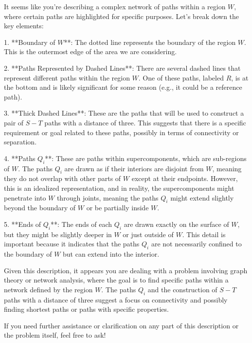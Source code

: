 It seems like you're describing a complex network of paths within a region \( W \), where certain paths are highlighted for specific purposes. Let's break down the key elements:

1. **Boundary of \( W \)**: The dotted line represents the boundary of the region \( W \). This is the outermost edge of the area we are considering.

2. **Paths Represented by Dashed Lines**: There are several dashed lines that represent different paths within the region \( W \). One of these paths, labeled \( R \), is at the bottom and is likely significant for some reason (e.g., it could be a reference path).

3. **Thick Dashed Lines**: These are the paths that will be used to construct a pair of \( S-T \) paths with a distance of three. This suggests that there is a specific requirement or goal related to these paths, possibly in terms of connectivity or separation.

4. **Paths \( Q_i \)**: These are paths within supercomponents, which are sub-regions of \( W \). The paths \( Q_i \) are drawn as if their interiors are disjoint from \( W \), meaning they do not overlap with other parts of \( W \) except at their endpoints. However, this is an idealized representation, and in reality, the supercomponents might penetrate into \( W \) through joints, meaning the paths \( Q_i \) might extend slightly beyond the boundary of \( W \) or be partially inside \( W \).

5. **Ends of \( Q_i \)**: The ends of each \( Q_i \) are drawn exactly on the surface of \( W \), but they might be slightly deeper in \( W \) or just outside of \( W \). This detail is important because it indicates that the paths \( Q_i \) are not necessarily confined to the boundary of \( W \) but can extend into the interior.

Given this description, it appears you are dealing with a problem involving graph theory or network analysis, where the goal is to find specific paths within a network defined by the region \( W \). The paths \( Q_i \) and the construction of \( S-T \) paths with a distance of three suggest a focus on connectivity and possibly finding shortest paths or paths with specific properties.

If you need further assistance or clarification on any part of this description or the problem itself, feel free to ask!